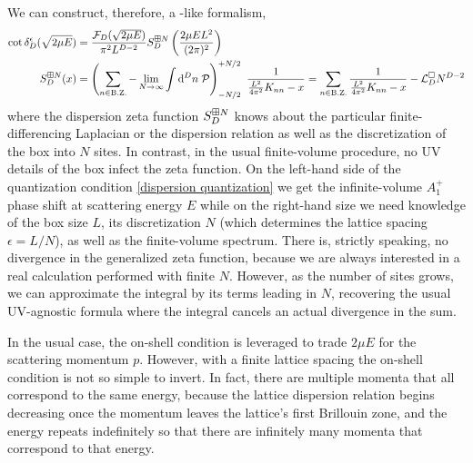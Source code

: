 We can construct, therefore, a \Luscher-like formalism,
 
\begin{align}
    \label{eq:dispersion quantization}
    \cot \delta_D^{\epsilon}( \sqrt{2 \mu E} ) &= \frac{\mathcal{F}_D(\sqrt{2 \mu E})}{\pi^2 L^{D-2}} S^{\boxplus N}_{D}\left(\frac{2\mu E L^2}{(2\pi)^2}\right)
    \\
    \label{eq:dispersion S}
    S^{\boxplus N}_{D}( x )
    &=
    \left(\sum_{n\in\text{B.Z.}} - \lim_{N\rightarrow\infty}\int \mathrm{d}^D n\; \mathcal{P} \right)_{-N/2}^{+N/2}\  \frac{1}{ \frac{L^2}{4\pi^2}K_{nn} - x} = \sum_{n\in\text{B.Z.}}\frac{1}{ \frac{L^2}{4\pi^2}K_{nn} - x} - \mathcal{L}_D^{\square}N^{D-2}
\end{align}
where the dispersion zeta function $S^{\boxplus N}_{D}$ knows about the particular finite-differencing Laplacian or the dispersion relation as well as the discretization of the box into $N$ sites.
In contrast, in the usual finite-volume procedure, no UV details of the box infect the zeta function.
On the left-hand side of the quantization condition \eqref{dispersion quantization} we get the infinite-volume $A_1^+$ phase shift at scattering energy $E$ while on the right-hand size we need knowledge of the box size $L$, its discretization $N$ (which determines the lattice spacing $\epsilon=L/N$), as well as the finite-volume spectrum.
There is, strictly speaking, no divergence in the generalized zeta function, because we are always interested in a real calculation performed with finite $N$.
However, as the number of sites grows, we can approximate the integral by its terms leading in $N$, recovering the usual UV-agnostic formula where the integral cancels an actual divergence in the sum.

In the usual case, the on-shell condition is leveraged to trade $2\mu E$ for the scattering momentum $p$.  However, with a finite lattice spacing the on-shell condition is not so simple to invert.
In fact, there are multiple momenta that all correspond to the same energy, because the lattice dispersion relation begins decreasing once the momentum leaves the lattice's first Brillouin zone, and the energy repeats indefinitely so that there are infinitely many momenta that correspond to that energy.

